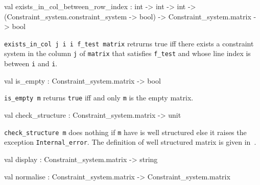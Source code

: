 \begin{ocamldocsigend}
\begin{ocamldocdescription}
\end{ocamldocdescription}


\label{val:Constraint-underscoresystem.Matrix.exists-underscorein-underscorecol-underscorebetween-underscorerow-underscoreindex}\begin{ocamldoccode}
val exists_in_col_between_row_index :
  int ->
  int ->
  int ->
  (Constraint_system.constraint_system -> bool) ->
  Constraint_system.matrix -> bool
\end{ocamldoccode}
\begin{ocamldocdescription}
{\tt{exists\_in\_col j i i{\textquotesingle} f\_test matrix}} retrurns true iff there exists a constraint system in the column {\tt{j}} of {\tt{matrix}} that satisfies {\tt{f\_test}}
    and whose line index is between {\tt{i}} and {\tt{i{\textquotesingle}}}.


\end{ocamldocdescription}


\label{val:Constraint-underscoresystem.Matrix.is-underscoreempty}\begin{ocamldoccode}
val is_empty : Constraint_system.matrix -> bool
\end{ocamldoccode}
\begin{ocamldocdescription}
{\tt{is\_empty m}} returns {\tt{true}} iff and only {\tt{m}} is the empty matrix.


\end{ocamldocdescription}


\label{val:Constraint-underscoresystem.Matrix.check-underscorestructure}\begin{ocamldoccode}
val check_structure : Constraint_system.matrix -> unit
\end{ocamldoccode}
\begin{ocamldocdescription}
{\tt{check\_structure m}} does nothing if {\tt{m}} have is well structured else it raises 
    the exception {\tt{Internal\_error}}. The definition of well structured matrix is given in~. 


\end{ocamldocdescription}


\label{val:Constraint-underscoresystem.Matrix.display}\begin{ocamldoccode}
val display : Constraint_system.matrix -> string
\end{ocamldoccode}


\label{val:Constraint-underscoresystem.Matrix.normalise}\begin{ocamldoccode}
val normalise : Constraint_system.matrix -> Constraint_system.matrix
\end{ocamldoccode}
\end{ocamldocsigend}






